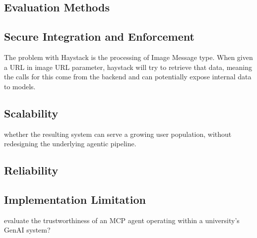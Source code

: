 \documentclass[english, 12pt, a4paper, elec, utf8, a-2b, online]{aaltothesis}
\begin{document}


\subsection{Evaluation Methods}

\subsection{Secure Integration and Enforcement}
The problem with Haystack is the processing of Image Message type.
When given a URL in image URL parameter, haystack will try to retrieve that data, meaning the calls for this come from the backend and can potentially expose internal data to models. 

\subsection{Scalability}
whether the resulting system can serve a growing user population, without redesigning the underlying agentic pipeline. 

\subsection{Reliability}

\subsection{Implementation Limitation}
\label{sec:implementation-limitations}
evaluate the trustworthiness of an MCP agent operating within a university's GenAI system?
\end{document}
